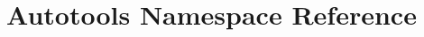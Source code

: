 \hypertarget{namespaceAutotools}{\section{Autotools Namespace Reference}
\label{namespaceAutotools}
}
